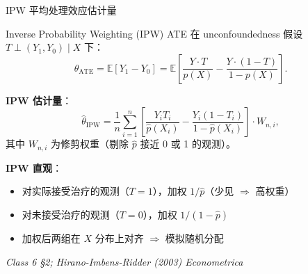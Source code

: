 \documentclass[aspectratio=169, 10pt]{beamer}
\begin{document}
\begin{frame}{IPW 平均处理效应估计量}

  \begin{definitionbox}{{Inverse Probability Weighting (IPW) ATE}}
    在 unconfoundedness 假设 $T \perp (Y_1, Y_0) \mid X$ 下：
    $$\theta_{\text{ATE}} = \mathbb{E}[Y_1 - Y_0]
    = \mathbb{E}\!\left[\frac{Y \cdot T}{p(X)} - \frac{Y \cdot (1-T)}{1 - p(X)}\right].$$

    \textbf{IPW 估计量}：
    $$\hat\theta_{\text{IPW}} = \frac{1}{n}\sum_{i=1}^n \left[
    \frac{Y_i T_i}{\hat p(X_i)} - \frac{Y_i (1 - T_i)}{1 - \hat p(X_i)}\right] \cdot W_{n,i},$$
    其中 $W_{n,i}$ 为修剪权重（剔除 $\hat p$ 接近 0 或 1 的观测）。
  \end{definitionbox}

  \begin{highlightbox}
    \textbf{IPW 直观}：
    \begin{itemize}\setlength{\itemsep}{1pt}
      \item 对实际接受治疗的观测（$T = 1$），加权 $1/\hat p$（少见 $\Rightarrow$ 高权重）
      \item 对未接受治疗的观测（$T = 0$），加权 $1/(1-\hat p)$
      \item 加权后两组在 $X$ 分布上对齐 $\Rightarrow$ 模拟随机分配
    \end{itemize}
  \end{highlightbox}

  \hfill{\scriptsize\textit{Class 6 §2; Hirano-Imbens-Ridder (2003) Econometrica}}

\end{frame}
\end{document}
